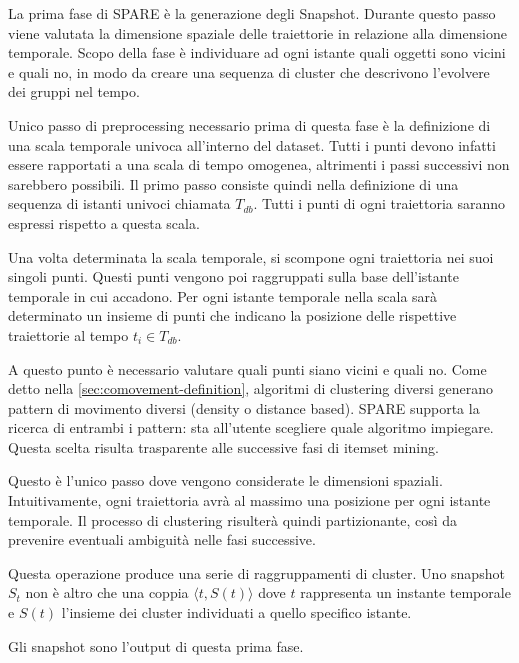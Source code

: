 La prima fase di SPARE è la generazione degli Snapshot.
Durante questo passo viene valutata la dimensione spaziale delle traiettorie in relazione alla dimensione temporale.
Scopo della fase è individuare ad ogni istante quali oggetti sono vicini e quali no, in modo da creare una sequenza di cluster che descrivono l'evolvere dei gruppi nel tempo.

Unico passo di preprocessing necessario prima di questa fase è la definizione di una scala temporale univoca all'interno del dataset.
Tutti i punti devono infatti essere rapportati a una scala di tempo omogenea, altrimenti i passi successivi non sarebbero possibili.
Il primo passo consiste quindi nella definizione di una sequenza di istanti univoci chiamata \(T_{db}\).
Tutti i punti di ogni traiettoria saranno espressi rispetto a questa scala.

Una volta determinata la scala temporale, si scompone ogni traiettoria nei suoi singoli punti.
Questi punti vengono poi raggruppati sulla base dell'istante temporale in cui accadono.
Per ogni istante temporale nella scala sarà determinato un insieme di punti che indicano la posizione delle rispettive traiettorie al tempo \(t_{i} \in T_{db}\).

A questo punto è necessario valutare quali punti siano vicini e quali no.
Come detto nella \cref{sec:comovement-definition}, algoritmi di clustering diversi generano pattern di movimento diversi (density o distance based).
SPARE supporta la ricerca di entrambi i pattern: sta all'utente scegliere quale algoritmo impiegare.
Questa scelta risulta trasparente alle successive fasi di itemset mining.

Questo è l'unico passo dove vengono considerate le dimensioni spaziali.
Intuitivamente, ogni traiettoria avrà al massimo una posizione per ogni istante temporale.
Il processo di clustering risulterà quindi partizionante, così da prevenire eventuali ambiguità nelle fasi successive.

Questa operazione produce una serie di raggruppamenti di cluster.
Uno snapshot \(S_t\) non è altro che una coppia \(\langle t, S(t) \rangle\) dove \(t\) rappresenta un instante temporale e \(S(t)\) l'insieme dei cluster individuati a quello specifico istante.

Gli snapshot sono l'output di questa prima fase.